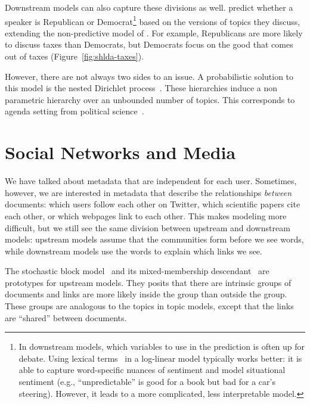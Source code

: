 Downstream models can also capture these divisions as well.
\citet{nguyen-13:shlda} predict whether a speaker is Republican or
Democrat\footnote{In downstream models, which variables to use in the
  prediction is often up for debate.  Using lexical
  terms~\citep{titov-08,zhao-10} in a log-linear model typically works
  better: it is able to capture word-specific nuances of sentiment and
  model situational sentiment (e.g., ``unpredictable'' is good for a
  book but bad for a car's steering).  However, it leads to a more
  complicated, less interpretable model.} based on the versions of
topics they discuss, extending the non-predictive model of
\citet{grimmer-09}.  For example, Republicans are more likely to
discuss taxes than Democrats, but Democrats focus on the
good that comes out of taxes (Figure~\ref{fig:shlda-taxes}).


However, there are not always two sides to an issue.  A probabilistic
solution to this model is the nested Dirichlet
process~\citep{blei-07}.  These hierarchies induce a non parametric
hierarchy over an unbounded number of topics.  This corresponds to
agenda setting from political
science~\citep{Nguyen:Boyd-Graber:Resnik:Miler-2015}.



\section{Social Networks and Media}

We have talked about metadata that are independent for each user.
Sometimes, however, we are interested in metadata that describe the
relationships \emph{between} documents: which users follow each other
on Twitter, which scientific papers cite each other, or which webpages
link to each other.  This makes modeling more difficult, but we still
see the same division between upstream and downstream models: upstream
models assume that the communities form before we see words, while
downstream models use the words to explain which links we see.

The stochastic block model~\citep{holland-83} and its mixed-membership
descendant~\citep{airoldi-08} are prototypes for upstream models.
They posits that there are intrinsic groups of documents and links are
more likely inside the group than outside the group.  These groups are
analogous to the topics in topic models, except that the links are
``shared'' between documents.

